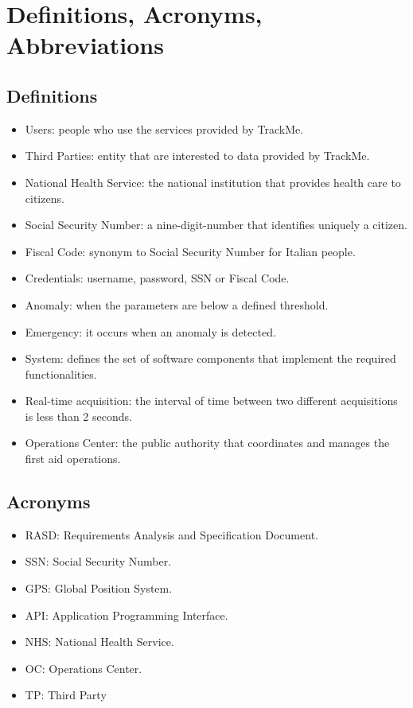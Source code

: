 \section{Definitions, Acronyms, Abbreviations}
\subsection{Definitions}
\begin{itemize}
    \item Users: people who use the services provided by TrackMe.
    \item Third Parties: entity that are interested to data provided by TrackMe.
    \item National Health Service: the national institution that provides health care to citizens.
    \item Social Security Number: a nine-digit-number that identifies uniquely a citizen.
    \item Fiscal Code: synonym to Social Security Number for Italian people.
    \item Credentials: username, password, SSN or Fiscal Code.
    \item Anomaly: when the parameters are below a defined threshold. 
    \item Emergency: it occurs when an anomaly is detected.
    \item System: defines the set of software components that implement the required functionalities.
    \item Real-time acquisition: the interval of time between two different acquisitions is less than 2 seconds.
    \item Operations Center: the public authority that coordinates and manages the first aid operations.
\end{itemize}

\subsection{Acronyms}
\begin{itemize}
    \item RASD: Requirements Analysis and Specification Document. 
    \item SSN: Social Security Number.
    \item GPS: Global Position System.
    \item API: Application Programming Interface.
    \item NHS: National Health Service.
    \item OC: Operations Center.
    \item TP: Third Party
\end{itemize}

